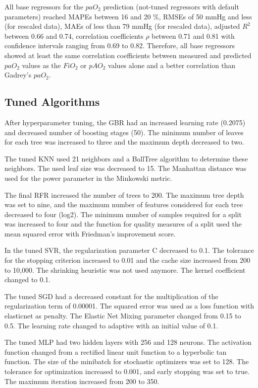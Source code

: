 \documentclass[referee,lineno,pdflatex,sn-nature]{sn-jnl}%
\theoremstyle{thmstyleone}%
\theoremstyle{thmstyletwo}%
\theoremstyle{thmstylethree}%
\begin{document}
All base regressors for the $paO_2$ prediction (not-tuned regressors with default parameters) reached MAPEs between 16 and 20 \%, RMSEs of 50 mmHg and less (for rescaled data), MAEs of less than 79 mmHg (for rescaled data), adjusted $R^2$ between 0.66 and 0.74, correlation coefficients $\rho$ between 0.71 and 0.81 with confidence intervals ranging from 0.69 to 0.82. Therefore, all base regressors showed at least the same correlation coefficients between measured and predicted $paO_2$ values as the $FiO_2$ or $pAO_2$ values alone and a better correlation than Gadrey’s $paO_2$.

\subsection{Tuned Algorithms}\label{sec3.4}
After hyperparameter tuning, the GBR had an increased learning rate (0.2075) and decreased number of boosting stages (50). The minimum number of leaves for each tree was increased to three and the maximum depth decreased to two.

The tuned KNN used 21 neighbors and a BallTree algorithm to determine these neighbors. The used leaf size was decreased to 15. The Manhattan distance was used for the power parameter in the Minkowski metric.

The final RFR increased the number of trees to 200. The maximum tree depth was set to nine, and the maximum number of features considered for each tree decreased to four (log2). The minimum number of samples required for a split was increased to four and the function for quality measures of a split used the mean squared error with Friedman’s improvement score.

In the tuned SVR, the regularization parameter C decreased to 0.1. The tolerance for the stopping criterion increased to 0.01 and the cache size increased from 200 to 10,000. The shrinking heuristic was not used anymore. The kernel coefficient changed to 0.1.

The tuned SGD had a decreased constant for the multiplication of the regularization term of 0.00001. The squared error was used as a loss function with elasticnet as penalty. The Elastic Net Mixing parameter changed from 0.15 to 0.5. The learning rate changed to adaptive with an initial value of 0.1.

The tuned MLP had two hidden layers with 256 and 128 neurons. The activation function changed from a rectified linear unit function to a hyperbolic tan function. The size of the minibatch for stochastic optimizers was set to 128. The tolerance for optimization increased to 0.001, and early stopping was set to true. The maximum iteration increased from 200 to 350.
\end{document}
